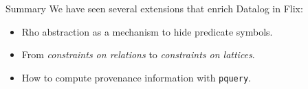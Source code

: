 \begin{frame}{Summary}
We have seen several extensions that enrich Datalog in Flix:

\begin{itemize}
    \item Rho abstraction as a mechanism to hide predicate symbols.
    \item From \emph{constraints on relations} to \emph{constraints on
    lattices}.
    \item How to compute provenance information with \lstinline{pquery}.
\end{itemize}
\end{frame}

\begin{frame}[standout]
\end{frame}


